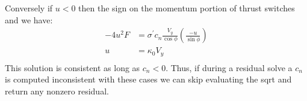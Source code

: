 \documentclass{article}
\begin{document}
Conversely if $u < 0$ then the sign on the momentum portion of thrust switches and we have:
\begin{equation}
\begin{aligned}
- 4 u^2 F&= \sigma^\prime c_n \frac{V_y}{\cos\phi} \left(\frac{-u}{\sin\phi}\right)\\
u &= \kappa_0 V_y\\
\end{aligned}
\end{equation}
This solution is consistent as long as $c_n < 0$.
Thus, if during a residual solve a $c_n$ is computed inconsistent with these cases we can skip evaluating the sqrt and return any nonzero residual.
\end{document}
